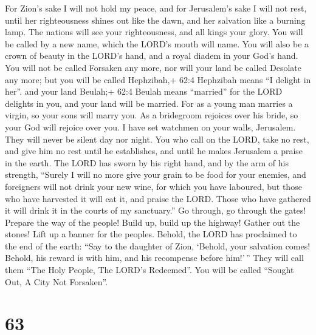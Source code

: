 For Zion's sake I will not hold my peace, and for
Jerusalem's sake I will not rest, until her righteousness shines out
like the dawn, and her salvation like a burning lamp.  The
nations will see your righteousness, and all kings your glory. You will
be called by a new name, which the LORD's mouth will name. 
You will also be a crown of beauty in the LORD's hand, and a royal
diadem in your God's hand.  You will not be called Forsaken
any more, nor will your land be called Desolate any more; but you will
be called Hephzibah,+ 62:4 Hephzibah means ``I delight in her''. and
your land Beulah;+ 62:4 Beulah means ``married'' for the LORD delights
in you, and your land will be married.  For as a young man
marries a virgin, so your sons will marry you. As a bridegroom rejoices
over his bride, so your God will rejoice over you.  I have
set watchmen on your walls, Jerusalem. They will never be silent day nor
night. You who call on the LORD, take no rest,  and give him
no rest until he establishes, and until he makes Jerusalem a praise in
the earth.  The LORD has sworn by his right hand, and by the
arm of his strength, ``Surely I will no more give your grain to be food
for your enemies, and foreigners will not drink your new wine, for which
you have laboured,  but those who have harvested it will eat
it, and praise the LORD. Those who have gathered it will drink it in the
courts of my sanctuary.''  Go through, go through the
gates! Prepare the way of the people! Build up, build up the highway!
Gather out the stones! Lift up a banner for the peoples. 
Behold, the LORD has proclaimed to the end of the earth: ``Say to the
daughter of Zion, `Behold, your salvation comes! Behold, his reward is
with him, and his recompense before him!'\,''  They will
call them ``The Holy People, The LORD's Redeemed''. You will be called
``Sought Out, A City Not Forsaken''.

\hypertarget{section-59}{%
\section{63}\label{section-59}}

